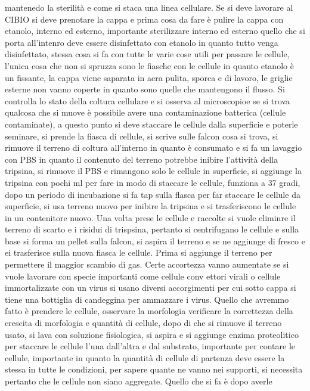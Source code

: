 mantenedo la sterilit\`a e come si staca una linea cellulare. Se si deve lavorare al CIBIO si deve prenotare la cappa e prima cosa da fare \`e pulire la cappa con etanolo, interno ed
esterno, importante sterilizzare interno ed esterno quello che si porta all'intenro deve essere disinfettato con etanolo in quanto tutto venga disinfettato, stessa cosa si fa con tutte 
le varie cose utili per passare le cellule, l'unica cosa che non si spruzza sono le fiasche con le cellule in quanto etanolo \`e un fissante, la cappa viene saparata in aera pulita, 
sporca e di lavoro, le griglie esterne non vanno coperte in quanto sono quelle che mantengono il flusso. Si controlla lo stato della coltura cellulare e si osserva al microscopioe se
si trova qualcosa che si muove \`e possibile avere una contaminazione batterica (cellule contaminate), a questo punto si deve staccare le cellule dalla superficie e poterle seminare, si
prende la fiasca di cellule, si scrive sulle falcon cosa si trova, si rimuove il terreno di coltura all'interno in quanto \`e consumato e si fa un lavaggio con PBS in quanto il contenuto
del terreno potrebbe inibire l'attivit\`a della tripsina, si rimuove il PBS e rimangono solo le cellule in superficie, si aggiunge la tripsina con pochi ml per fare in modo di staccare
le cellule, funziona a 37 gradi, dopo un periodo di incubazione si fa tap sulla flasca per far staccare le cellule da superficie, si usa terreno nuovo per inibire la tripsina e si
trasferiscono le cellule in un contenitore nuovo. Una volta prese le cellule e raccolte si vuole eliminre il terreno di scarto e i risidui di trispsina, pertanto si centrifugano le 
cellule e sulla base si forma un pellet sulla falcon, si aspira il terreno e se ne aggiunge di fresco e ei trasferisce sulla nuova fiasca le cellule. Prima si aggiunge il terreno per
permettere il maggior scambio di gas. Certe accortezza vanno aumentate se si vuole lavorare con specie importanti come cellule conv ettori virali o cellule immortalizzate con un virus 
si usano diversi accorgimenti per cui sotto cappa si tiene una bottiglia di candeggina per ammazzare i virus. Quello che avremmo fatto \`e prendere le cellule, osservare la morfologia
verificare la correttezza della crescita di morfologia e quantit\`a di cellule, dopo di che si rimuove il terreno usato, si lava con soluzione fisiologica, si aspira e si aggiunge 
enzima proteolitico per staccare le cellule l'una dall'altra e dal substrato, importante per contare le cellule, importante in quanto la quantit\`a di cellule di partenza deve essere
la stessa in tutte le condizioni, per sapere quante ne vanno nei supporti, si necessita pertanto che le cellule non siano aggregate. Quello che si fa \`e dopo averle 
